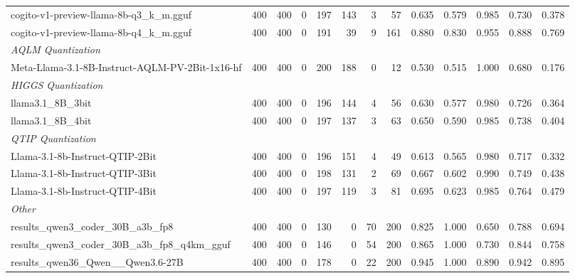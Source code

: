 \begin{table}[htbp]
{\begin{tabular}{lrrrrrrrrrrrr}
    cogito-v1-preview-llama-8b-q3\_k\_m.gguf & 400 & 400 & 0 & 197 & 143 & 3 & 57 & 0.635 & 0.579 & 0.985 & 0.730 & 0.378 \\
    cogito-v1-preview-llama-8b-q4\_k\_m.gguf & 400 & 400 & 0 & 191 & 39 & 9 & 161 & 0.880 & 0.830 & 0.955 & 0.888 & 0.769 \\
    \midrule
    \multicolumn{13}{l}{\textit{AQLM Quantization}} \\
    \midrule
    Meta-Llama-3.1-8B-Instruct-AQLM-PV-2Bit-1x16-hf & 400 & 400 & 0 & 200 & 188 & 0 & 12 & 0.530 & 0.515 & 1.000 & 0.680 & 0.176 \\
    \midrule
    \multicolumn{13}{l}{\textit{HIGGS Quantization}} \\
    \midrule
    llama3.1\_8B\_3bit & 400 & 400 & 0 & 196 & 144 & 4 & 56 & 0.630 & 0.577 & 0.980 & 0.726 & 0.364 \\
    llama3.1\_8B\_4bit & 400 & 400 & 0 & 197 & 137 & 3 & 63 & 0.650 & 0.590 & 0.985 & 0.738 & 0.404 \\
    \midrule
    \multicolumn{13}{l}{\textit{QTIP Quantization}} \\
    \midrule
    Llama-3.1-8b-Instruct-QTIP-2Bit & 400 & 400 & 0 & 196 & 151 & 4 & 49 & 0.613 & 0.565 & 0.980 & 0.717 & 0.332 \\
    Llama-3.1-8b-Instruct-QTIP-3Bit & 400 & 400 & 0 & 198 & 131 & 2 & 69 & 0.667 & 0.602 & 0.990 & 0.749 & 0.438 \\
    Llama-3.1-8b-Instruct-QTIP-4Bit & 400 & 400 & 0 & 197 & 119 & 3 & 81 & 0.695 & 0.623 & 0.985 & 0.764 & 0.479 \\
    \midrule
    \multicolumn{13}{l}{\textit{Other}} \\
    \midrule
    results\_qwen3\_coder\_30B\_a3b\_fp8 & 400 & 400 & 0 & 130 & 0 & 70 & 200 & 0.825 & 1.000 & 0.650 & 0.788 & 0.694 \\
    results\_qwen3\_coder\_30B\_a3b\_fp8\_q4km\_gguf & 400 & 400 & 0 & 146 & 0 & 54 & 200 & 0.865 & 1.000 & 0.730 & 0.844 & 0.758 \\
    results\_qwen36\_Qwen\_\_Qwen3.6-27B & 400 & 400 & 0 & 178 & 0 & 22 & 200 & 0.945 & 1.000 & 0.890 & 0.942 & 0.895 \\
    \bottomrule
  \end{tabular}
  }
\end{table}


